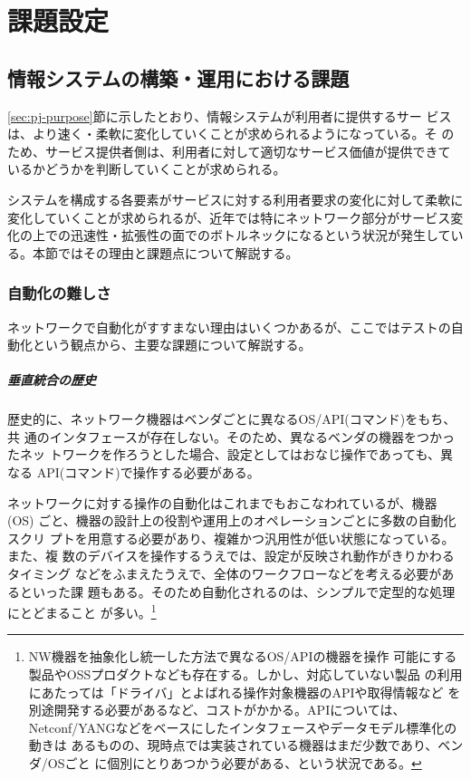 
\chapter{課題設定}
\label{chap:problem-setting}

 \section{情報システムの構築・運用における課題}
 \label{sec:system-problem}

\ref{sec:pj-purpose}節に示したとおり、情報システムが利用者に提供するサー
ビスは、より速く・柔軟に変化していくことが求められるようになっている。そ
のため、サービス提供者側は、利用者に対して適切なサービス価値が提供できて
いるかどうかを判断していくことが求められる。

システムを構成する各要素がサービスに対する利用者要求の変化に対して柔軟に
変化していくことが求められるが、近年では特にネットワーク部分がサービス変
化の上での迅速性・拡張性の面でのボトルネックになるという状況が発生してい
る。本節ではその理由と課題点について解説する。


  \subsection{自動化の難しさ}
  \label{sec:difficulty}

ネットワークで自動化がすすまない理由はいくつかあるが、ここではテストの自
動化という観点から、主要な課題について解説する。

    \paragraph{垂直統合の歴史}
歴史的に、ネットワーク機器はベンダごとに異なるOS/API(コマンド)をもち、共
通のインタフェースが存在しない。そのため、異なるベンダの機器をつかったネッ
トワークを作ろうとした場合、設定としてはおなじ操作であっても、異なる
API(コマンド)で操作する必要がある。

ネットワークに対する操作の自動化はこれまでもおこなわれているが、機器(OS)
ごと、機器の設計上の役割や運用上のオペレーションごとに多数の自動化スクリ
プトを用意する必要があり、複雑かつ汎用性が低い状態になっている。また、複
数のデバイスを操作するうえでは、設定が反映され動作がきりかわるタイミング
などをふまえたうえで、全体のワークフローなどを考える必要があるといった課
題もある。そのため自動化されるのは、シンプルで定型的な処理にとどまること
が多い。\footnote{NW機器を抽象化し統一した方法で異なるOS/APIの機器を操作
可能にする製品やOSSプロダクトなども存在する。しかし、対応していない製品
の利用にあたっては「ドライバ」とよばれる操作対象機器のAPIや取得情報など
を別途開発する必要があるなど、コストがかかる。APIについては、
Netconf/YANGなどをベースにしたインタフェースやデータモデル標準化の動きは
あるものの、現時点では実装されている機器はまだ少数であり、ベンダ/OSごと
に個別にとりあつかう必要がある、という状況である。}

